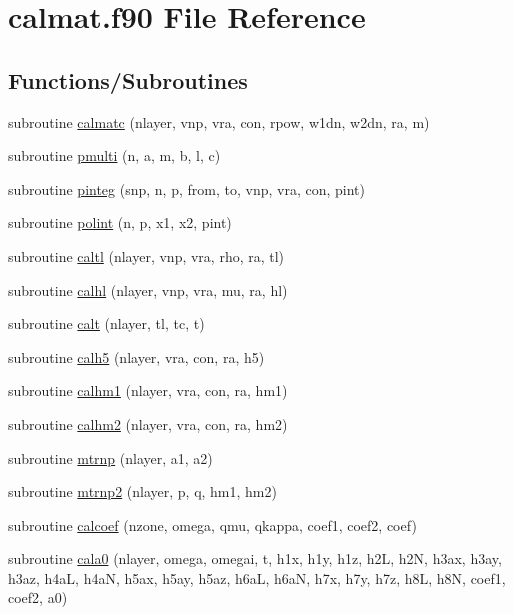 \hypertarget{calmat_8f90}{\section{calmat.\-f90 File Reference}
\label{calmat_8f90}
}
\subsection*{Functions/\-Subroutines}
\begin{DoxyCompactItemize}
\item 
subroutine \hyperlink{calmat_8f90_ab9e42adb3afb71662f5161c5eaf2b07b}{calmatc} (nlayer, vnp, vra, con, rpow, w1dn, w2dn, ra, m)
\item 
subroutine \hyperlink{calmat_8f90_a728f868a13ca10b648e97198fc88dc13}{pmulti} (n, a, m, b, l, c)
\item 
subroutine \hyperlink{calmat_8f90_acf161e83a5a9f420fbc7441c97ba0ed8}{pinteg} (snp, n, p, from, to, vnp, vra, con, pint)
\item 
subroutine \hyperlink{calmat_8f90_ac0cec2daf6a3c6bb773fd666d4315eed}{polint} (n, p, x1, x2, pint)
\item 
subroutine \hyperlink{calmat_8f90_acb8eafbf308597edcd9469f0516bc0d1}{caltl} (nlayer, vnp, vra, rho, ra, tl)
\item 
subroutine \hyperlink{calmat_8f90_ae16b6b5cf74241a29c390f201b7f8360}{calhl} (nlayer, vnp, vra, mu, ra, hl)
\item 
subroutine \hyperlink{calmat_8f90_a58eafb8aa75e78a8b7740dc574c9a1d6}{calt} (nlayer, tl, tc, t)
\item 
subroutine \hyperlink{calmat_8f90_a3624a08c2dd94386a0ce4c98652e0fdb}{calh5} (nlayer, vra, con, ra, h5)
\item 
subroutine \hyperlink{calmat_8f90_ae3a1cd61533d8a1e75c0c91b781da625}{calhm1} (nlayer, vra, con, ra, hm1)
\item 
subroutine \hyperlink{calmat_8f90_a4b16591e117478c50f5628ab6e6f504b}{calhm2} (nlayer, vra, con, ra, hm2)
\item 
subroutine \hyperlink{calmat_8f90_ab64d8afe5418da96b28cc65b3634ed34}{mtrnp} (nlayer, a1, a2)
\item 
subroutine \hyperlink{calmat_8f90_a2bd08ce10d1ce842f82fc3c8087636e6}{mtrnp2} (nlayer, p, q, hm1, hm2)
\item 
subroutine \hyperlink{calmat_8f90_aeaea3a44d921c4b637d643c0d36684f4}{calcoef} (nzone, omega, qmu, qkappa, coef1, coef2, coef)
\item 
subroutine \hyperlink{calmat_8f90_a2cacc65e55dad87e63c5b94bda58e6ea}{cala0} (nlayer, omega, omegai, t, h1x, h1y, h1z, h2\-L, h2\-N, h3ax, h3ay, h3az, h4a\-L, h4a\-N, h5ax, h5ay, h5az, h6a\-L, h6a\-N, h7x, h7y, h7z, h8\-L, h8\-N, coef1, coef2, a0)

\end{DoxyCompactItemize}

